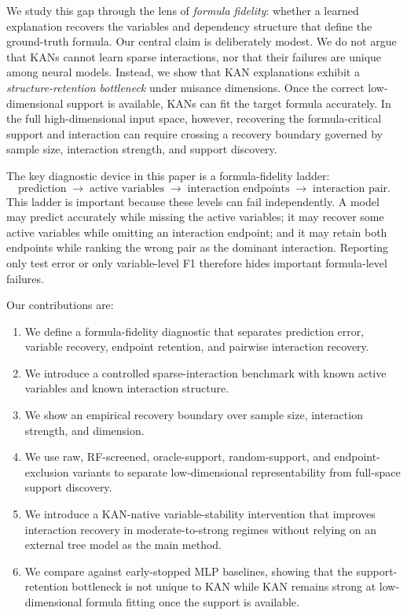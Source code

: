 \documentclass[11pt]{article}
\begin{document}
We study this gap through the lens of \emph{formula fidelity}: whether a learned explanation recovers the variables and dependency structure that define the ground-truth formula. Our central claim is deliberately modest. We do not argue that KANs cannot learn sparse interactions, nor that their failures are unique among neural models. Instead, we show that KAN explanations exhibit a \emph{structure-retention bottleneck} under nuisance dimensions. Once the correct low-dimensional support is available, KANs can fit the target formula accurately. In the full high-dimensional input space, however, recovering the formula-critical support and interaction can require crossing a recovery boundary governed by sample size, interaction strength, and support discovery.

The key diagnostic device in this paper is a formula-fidelity ladder:
\[
\text{prediction}
\;\rightarrow\;
\text{active variables}
\;\rightarrow\;
\text{interaction endpoints}
\;\rightarrow\;
\text{interaction pair}.
\]
This ladder is important because these levels can fail independently. A model may predict accurately while missing the active variables; it may recover some active variables while omitting an interaction endpoint; and it may retain both endpoints while ranking the wrong pair as the dominant interaction. Reporting only test error or only variable-level F1 therefore hides important formula-level failures.

Our contributions are:
\begin{enumerate}
    \item We define a formula-fidelity diagnostic that separates prediction error, variable recovery, endpoint retention, and pairwise interaction recovery.
    \item We introduce a controlled sparse-interaction benchmark with known active variables and known interaction structure.
    \item We show an empirical recovery boundary over sample size, interaction strength, and dimension.
    \item We use raw, RF-screened, oracle-support, random-support, and endpoint-exclusion variants to separate low-dimensional representability from full-space support discovery.
    \item We introduce a KAN-native variable-stability intervention that improves interaction recovery in moderate-to-strong regimes without relying on an external tree model as the main method.
    \item We compare against early-stopped MLP baselines, showing that the support-retention bottleneck is not unique to KAN while KAN remains strong at low-dimensional formula fitting once the support is available.
\end{enumerate}
\end{document}
